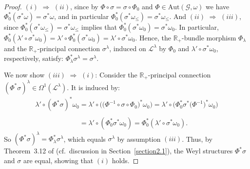 \documentclass[11pt]{article}
\def\R{\mathbb{R}}
\def\Gbdle{\mathcal{G}}
\theoremstyle{plain}
\theoremstyle{definition}
\begin{document}
\begin{proof} $(i)$ $\Rightarrow$ $(ii)$, since by $\Phi \circ \sigma = \sigma \circ \Phi_0$ and $\Phi \in \mathrm{Aut}(\Gbdle,\omega)$ we have $\Phi_0^*(\sigma^*\omega) = \sigma^*\omega$, and in particular $\Phi_0^*(\sigma^*\omega_{\leq}) = \sigma^*\omega_{\leq}$. And $(ii)$ $\Rightarrow$ $(iii)$, since $\Phi_0^*(\sigma^*\omega_{\leq}) = \sigma^*\omega_{\leq}$ implies that $\Phi_0^*(\sigma^*\omega_0) = \sigma^*\omega_0$. In particular, $\Phi_0^*(\lambda' \circ \sigma^*\omega_0) = \lambda' \circ \Phi_0^*(\sigma^*\omega_0) = \lambda' \circ \sigma^*\omega_0$. Hence, the $\R_+$-bundle morphism $\Phi_{\lambda}$ and the $\R_+$-principal connection $\sigma^{\lambda}$, induced on $\mathcal{L}^{\lambda}$ by $\Phi_0$ and $\lambda' \circ \sigma^*\omega_0$, respectively, satisfy: $\Phi_{\lambda}^* \sigma^{\lambda} = \sigma^{\lambda}$.

  We now show $(iii)$ $\Rightarrow$ $(i)$: Consider the $\R_+$-principal connection $(\Phi^*\sigma)^{\lambda} \in \Omega^1(\mathcal{L}^{\lambda})$. It is induced by:
\begin{gather*}
\lambda' \circ (\Phi^*\sigma)^*\omega_0  = \lambda' \circ \big(\big(\Phi^{-1}\circ \sigma \circ \Phi_0\big)^*\omega_0\big)
  = \lambda' \circ \big(\Phi_0^*\sigma^*\big(\Phi^{-1}\big)^*\omega_0\big) \\
\phantom{\lambda' \circ (\Phi^*\sigma)^*\omega_0}{} = \lambda' \circ (\Phi_0^*\sigma^*\omega_0) = \Phi_0^*(\lambda' \circ \sigma^*\omega_0).
\end{gather*}
So $(\Phi^*\sigma)^{\lambda} = \Phi_{\lambda}^*\sigma^{\lambda}$, which equals $\sigma^{\lambda}$ by assumption $(iii)$. Thus, by Theorem~3.12 of \cite{CS03} (cf.\ discussion in Section~\ref{section2.1}), the Weyl structures $\Phi^*\sigma$ and $\sigma$ are equal, showing that $(i)$ holds.


\end{proof}
\end{document}
